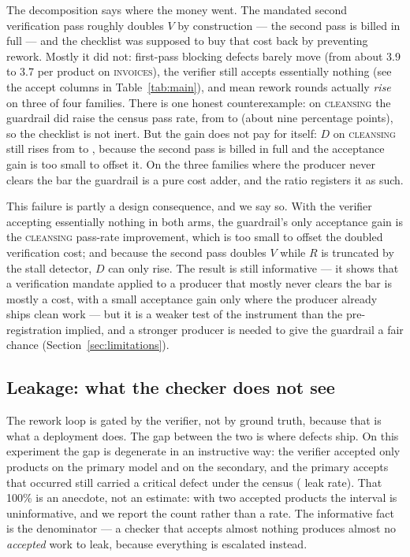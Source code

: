\documentclass[11pt]{article}
\newcommand{\D}{\ensuremath{D}}
\newcommand{\VV}{\ensuremath{V}}
\newcommand{\RV}{\ensuremath{R}}
\newcommand{\famname}[1]{\textsc{#1}}
\begin{document}
The decomposition says where the money went. The mandated second verification pass roughly doubles
$\VV$ by construction --- the second pass is billed in full --- and the checklist was supposed to
buy that cost back by preventing rework. Mostly it did not: first-pass blocking defects barely move
(from about 3.9 to 3.7 per product on \famname{invoices}), the verifier still accepts essentially
nothing (see the accept columns in Table~\ref{tab:main}), and mean rework rounds actually \emph{rise}
on three of four families. There is one honest counterexample: on \famname{cleansing} the guardrail
did raise the census pass rate, from \VDCleansePass{} to \VDCleanseGuardPass{} (about nine
percentage points), so the checklist is not inert. But the gain does not pay for itself: $\D$ on
\famname{cleansing} still rises from \VDCleanseGuardBase{} to \VDCleanseGuardD{}, because the second
pass is billed in full and the acceptance gain is too small to offset it. On the three families where
the producer never clears the bar the guardrail is a pure cost adder, and the ratio registers it as
such.

This failure is partly a design consequence, and we say so. With the verifier accepting
essentially nothing in both arms, the guardrail's only acceptance gain is the \famname{cleansing}
pass-rate improvement, which is too small to offset the doubled verification cost; and because the
second pass doubles $\VV$ while $\RV$ is truncated by the stall detector, $\D$ can only rise.
The result is still informative --- it shows that a verification mandate applied to a producer that
mostly never clears the bar is mostly a cost, with a small acceptance gain only where the producer
already ships clean work --- but it is a weaker test of the instrument than the pre-registration
implied, and a stronger producer is needed to give the guardrail a fair chance
(Section~\ref{sec:limitations}).

\subsection{Leakage: what the checker does not see}
\label{sec:leakage}

The rework loop is gated by the verifier, not by ground truth, because that is what a deployment
does. The gap between the two is where defects ship. On this experiment the gap is degenerate in
an instructive way: the verifier accepted only \VDqBaseAcc{} products on the primary model and
\VDlBaseAcc{} on the secondary, and the primary accepts that occurred still carried a critical
defect under the census (\VDqLeak{} leak rate). That 100\% is an anecdote, not an estimate: with two accepted products the
interval is uninformative, and we report the count rather than a rate. The informative fact is the
denominator --- a checker that accepts almost nothing produces almost no \emph{accepted} work to
leak, because everything is escalated instead.
\end{document}
